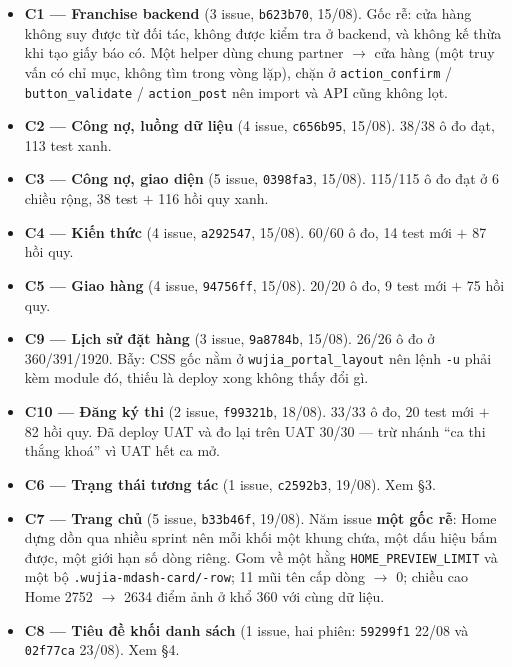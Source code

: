 \begin{itemize}
\item \textbf{C1 --- Franchise backend} (3 issue, \texttt{b623b70}, 15/08). Gốc rễ: cửa hàng
  không suy được từ đối tác, không được kiểm tra ở backend, và không kế thừa khi tạo giấy báo
  có. Một helper dùng chung partner $\rightarrow$ cửa hàng (một truy vấn có chỉ mục, không tìm
  trong vòng lặp), chặn ở \texttt{action\_confirm} / \texttt{button\_validate} /
  \texttt{action\_post} nên import và API cũng không lọt.

\item \textbf{C2 --- Công nợ, luồng dữ liệu} (4 issue, \texttt{c656b95}, 15/08). 38/38 ô đo
  đạt, 113 test xanh.

\item \textbf{C3 --- Công nợ, giao diện} (5 issue, \texttt{0398fa3}, 15/08). 115/115 ô đo đạt
  ở 6 chiều rộng, 38 test $+$ 116 hồi quy xanh.

\item \textbf{C4 --- Kiến thức} (4 issue, \texttt{a292547}, 15/08). 60/60 ô đo, 14 test mới
  $+$ 87 hồi quy.

\item \textbf{C5 --- Giao hàng} (4 issue, \texttt{94756ff}, 15/08). 20/20 ô đo, 9 test mới
  $+$ 75 hồi quy.

\item \textbf{C9 --- Lịch sử đặt hàng} (3 issue, \texttt{9a8784b}, 15/08). 26/26 ô đo ở
  360/391/1920. Bẫy: CSS gốc nằm ở \texttt{wujia\_portal\_layout} nên lệnh \texttt{-u} phải
  kèm module đó, thiếu là deploy xong không thấy đổi gì.

\item \textbf{C10 --- Đăng ký thi} (2 issue, \texttt{f99321b}, 18/08). 33/33 ô đo, 20 test mới
  $+$ 82 hồi quy. Đã deploy UAT và đo lại trên UAT 30/30 --- trừ nhánh ``ca thi thắng khoá'' vì
  UAT hết ca mở.

\item \textbf{C6 --- Trạng thái tương tác} (1 issue, \texttt{c2592b3}, 19/08). Xem §3.

\item \textbf{C7 --- Trang chủ} (5 issue, \texttt{b33b46f}, 19/08). Năm issue \textbf{một gốc
  rễ}: Home dựng dồn qua nhiều sprint nên mỗi khối một khung chứa, một dấu hiệu bấm được, một
  giới hạn số dòng riêng. Gom về một hằng \texttt{HOME\_PREVIEW\_LIMIT} và một bộ
  \texttt{.wujia-mdash-card/-row}; 11 mũi tên cấp dòng $\rightarrow$ 0; chiều cao Home
  2752 $\rightarrow$ 2634 điểm ảnh ở khổ 360 với cùng dữ liệu.

\item \textbf{C8 --- Tiêu đề khối danh sách} (1 issue, hai phiên: \texttt{59299f1} 22/08 và
  \texttt{02f77ca} 23/08). Xem §4.
\end{itemize}

